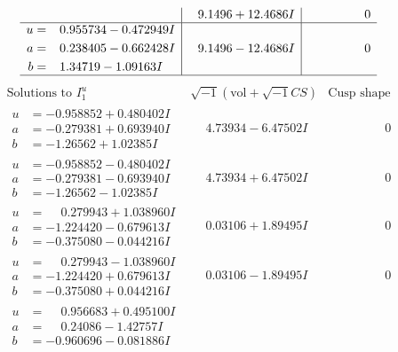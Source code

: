 \documentclass[1p]{elsarticle_modified}
\theoremstyle{definition}
\newcommand{\I}{\sqrt{-1}}
\begin{document}
$$\begin{array}{c|c|c}
 & \phantom{-}9.1496 + 12.4686 I & \phantom{-0.000000 } 0 \\ \hline\begin{aligned}
u &= \phantom{-}0.955734 - 0.472949 I \\
a &= \phantom{-}0.238405 - 0.662428 I \\
b &= \phantom{-}1.34719 - 1.09163 I\end{aligned}
 & \phantom{-}9.1496 - 12.4686 I & \phantom{-0.000000 } 0\\
 \hline 
 \end{array}$$\newpage$$\begin{array}{c|c|c}  
\text{Solutions to }I^u_{1}& \I (\text{vol} + \sqrt{-1}CS) & \text{Cusp shape}\\
 \hline 
\begin{aligned}
u &= -0.958852 + 0.480402 I \\
a &= -0.279381 + 0.693940 I \\
b &= -1.26562 + 1.02385 I\end{aligned}
 & \phantom{-}4.73934 - 6.47502 I & \phantom{-0.000000 } 0 \\ \hline\begin{aligned}
u &= -0.958852 - 0.480402 I \\
a &= -0.279381 - 0.693940 I \\
b &= -1.26562 - 1.02385 I\end{aligned}
 & \phantom{-}4.73934 + 6.47502 I & \phantom{-0.000000 } 0 \\ \hline\begin{aligned}
u &= \phantom{-}0.279943 + 1.038960 I \\
a &= -1.224420 - 0.679613 I \\
b &= -0.375080 - 0.044216 I\end{aligned}
 & \phantom{-}0.03106 + 1.89495 I & \phantom{-0.000000 } 0 \\ \hline\begin{aligned}
u &= \phantom{-}0.279943 - 1.038960 I \\
a &= -1.224420 + 0.679613 I \\
b &= -0.375080 + 0.044216 I\end{aligned}
 & \phantom{-}0.03106 - 1.89495 I & \phantom{-0.000000 } 0 \\ \hline\begin{aligned}
u &= \phantom{-}0.956683 + 0.495100 I \\
a &= \phantom{-}0.24086 - 1.42757 I \\
b &= -0.960696 - 0.081886 I\end{aligned}

\end{array}$$
\end{document}
